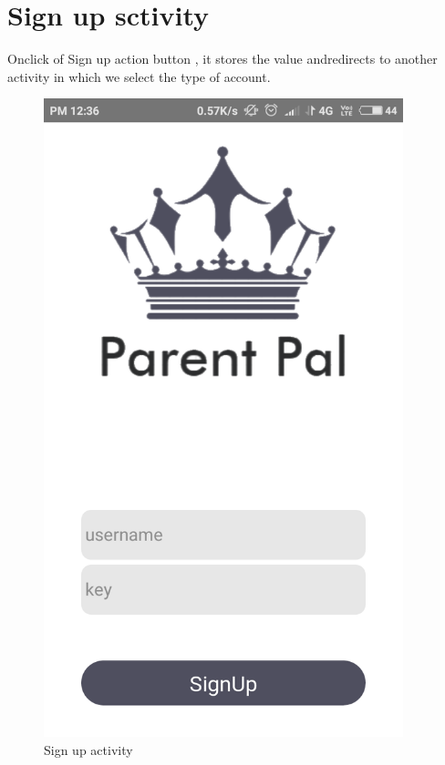 \section{Sign up sctivity}
Onclick of Sign up action button , it stores the value andredirects to another activity in which we select the type of account.
\begin{figure}[!h]
	\centering
	\includegraphics[height=7.3in]{Signup.PNG}
	\caption{Sign up activity}
\end{figure}
\newpage
